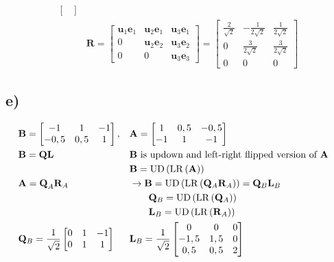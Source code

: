 \begin{align*}
\begin{bmatrix}
	\end{bmatrix}& \\
	&\mathbf{R}=
	\begin{bmatrix}
	\mathbf{u}_{1}\mathbf{e}_{1} & \mathbf{u}_{2}\mathbf{e}_{1} & \mathbf{u}_{3}\mathbf{e}_{1} \\
	0 & \mathbf{u}_{2}\mathbf{e}_{2} & \mathbf{u}_{3}\mathbf{e}_{2} \\
	0 & 0 & \mathbf{u}_{3}\mathbf{e}_{3}
	\end{bmatrix}=
	\begin{bmatrix}
	\frac{2}{\sqrt{2}} & -\frac{1}{2\sqrt{2}} & \frac{1}{2\sqrt{2}} \\
	0 & \frac{3}{2\sqrt{2}} & \frac{3}{2\sqrt{2}} \\
	0 & 0 & 0
	\end{bmatrix}
\end{align*}

\subsection*{e)}
\begin{align*}
	&\mathbf{B}=
	\begin{bmatrix}
	-1 & 1 & -1 \\
	-0,5 & 0,5 & 1
	\end{bmatrix},&&\mathbf{A}=
	\begin{bmatrix}
	1 & 0,5 & -0,5 \\
	-1 & 1 & -1
	\end{bmatrix}& \\
	&\mathbf{B=QL}&&\text{$\mathbf{B}$ is updown and left-right flipped version of $\mathbf{A}$}& \\
	&& &\mathbf{B}=\operatorname{UD}\left(\operatorname{LR}\left(\mathbf{A}\right)\right)& \\
	&\mathbf{A=Q}_{A}\mathbf{R}_{A}& &\rightarrow\mathbf{B}=\operatorname{UD}\left(\operatorname{LR}\left(\mathbf{Q}_{A}\mathbf{R}_{A}\right)\right)=\mathbf{Q}_{B}\mathbf{L}_{B}& \\
	&& &\qquad\mathbf{Q}_{B}=\operatorname{UD}\left(\operatorname{LR}\left(\mathbf{Q}_{A}\right)\right)& \\
	&& &\qquad\mathbf{L}_{B}=\operatorname{UD}\left(\operatorname{LR}\left(\mathbf{R}_{A}\right)\right)& \\
	&\mathbf{Q}_{B}=\frac{1}{\sqrt{2}}
	\begin{bmatrix}
	0 & 1 & -1 \\
	0 & 1 & 1
	\end{bmatrix}&
	&\mathbf{L}_{B}=\frac{1}{\sqrt{2}}
	\begin{bmatrix}
	0 & 0 & 0 \\
	-1,5 & 1,5 & 0 \\
	0,5 & 0,5 & 2
	\end{bmatrix}&
\end{align*}